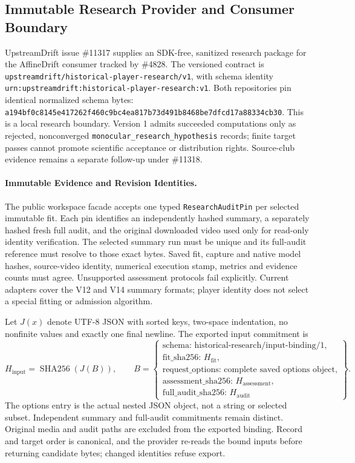 \documentclass[11pt,letterpaper]{article}
\newcommand{\code}[1]{\nolinkurl{#1}}
\newcommand{\hash}[1]{{\footnotesize\nolinkurl{#1}}}
\begin{document}
\subsection{Immutable Research Provider and Consumer Boundary}
\label{sec:research-handoff}
UpstreamDrift issue \#11317 supplies an SDK-free, sanitized research package
for the AffineDrift consumer tracked by \#4828. The versioned contract is
\code{upstreamdrift/historical-player-research/v1}, with schema identity
\code{urn:upstreamdrift:historical-player-research:v1}. Both repositories pin
identical normalized schema bytes:
\hash{a194bf0c8145e417262f460c9bc4ea817b73d491b8468be7dfcd17a88334cb30}.
This is a local research boundary. Version 1 admits succeeded computations
only as rejected, nonconverged \code{monocular_research_hypothesis} records;
finite target passes cannot promote scientific acceptance or distribution
rights. Source-club evidence remains a separate follow-up under \#11318.

\paragraph{Immutable Evidence and Revision Identities.}
The public workspace facade accepts one typed \code{ResearchAuditPin} per
selected immutable fit. Each pin identifies an independently hashed summary,
a separately hashed fresh full audit, and the original downloaded video used
only for read-only identity verification. The selected summary run must be
unique and its full-audit reference must resolve to those exact bytes. Saved
fit, capture and native model hashes, source-video identity, numerical execution
stamp, metrics and evidence counts must agree. Unsupported assessment protocols
fail explicitly. Current adapters cover the V12 and V14 summary formats;
player identity does not select a special fitting or admission algorithm.

Let $J(x)$ denote UTF-8 JSON with sorted keys, two-space indentation, no
nonfinite values and exactly one final newline. The exported input commitment is
\begin{equation}
 H_{\mathrm{input}}=\operatorname{SHA256}\!\left(J(B)\right),\qquad
 B=\left\{\begin{array}{l}
 \text{schema: historical-research/input-binding/1},\\
 \text{fit\_sha256: }H_{\mathrm{fit}},\\
 \text{request\_options: complete saved options object},\\
 \text{assessment\_sha256: }H_{\mathrm{assessment}},\\
 \text{full\_audit\_sha256: }H_{\mathrm{audit}}
 \end{array}\right\}.
 \label{eq:research-input-binding}
\end{equation}
The options entry is the actual nested JSON object, not a string or selected
subset. Independent summary and full-audit commitments remain distinct.
Original media and audit paths are excluded from the exported binding. Record
and target order is canonical, and the provider re-reads the bound inputs
before returning candidate bytes; changed identities refuse export.
\end{document}
